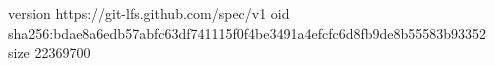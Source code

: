 version https://git-lfs.github.com/spec/v1
oid sha256:bdae8a6edb57abfc63df741115f0f4be3491a4efcfc6d8fb9de8b55583b93352
size 22369700
